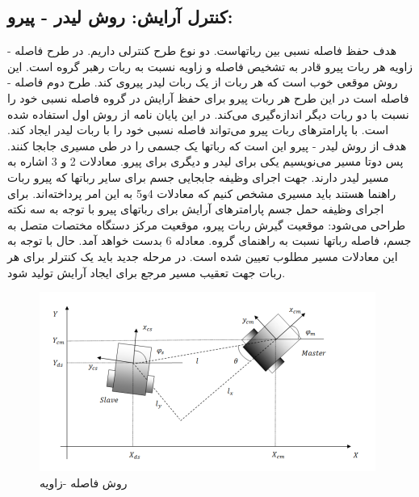 \subsection{کنترل آرایش: روش لیدر - پیرو:}
هدف حفظ فاصله نسبی بین رباتهاست. دو نوع طرح کنترلی داریم. در طرح فاصله - زاویه هر ربات پیرو قادر به تشخیص فاصله و زاویه نسبت به ربات رهبر گروه است. این روش موقعی خوب است که هر ربات از یک ربات لیدر پیروی کند.
طرح دوم فاصله - فاصله است در این طرح هر ربات پیرو برای حفظ آرایش در گروه فاصله نسبی خود را نسبت با دو ربات دیگر اندازه‌گیری می‌کند.
در این پایان نامه از روش اول استفاده شده است.
با پارامترهای 
ربات پیرو می‌تواند فاصله نسبی خود را با ربات لیدر ایجاد کند.
هدف از روش لیدر - پیرو این است که رباتها یک جسمی را در طی مسیری جابجا کنند. پس دوتا مسیر می‌نویسیم یکی برای لیدر و دیگری برای پیرو. معادلات 2 و 3 اشاره به مسیر لیدر دارند. جهت اجرای وظیفه جابجایی جسم برای سایر رباتها که پیرو ربات راهنما هستند باید مسیری مشخص کنیم که معادلات 4و5 به این امر پرداخته‌اند.
برای اجرای وظیفه حمل جسم پارامترهای آرایش برای رباتهای پیرو با توجه به سه نکته طراحی می‌شود: موقعیت گیرش ربات پیرو، موقعیت مرکز دستگاه مختصات متصل به جسم، فاصله رباتها نسبت به راهنمای گروه. معادله 6 بدست خواهد آمد.
حال با توجه به این معادلات مسیر مطلوب تعیین شده است.
در مرحله جدید باید یک کنترلر برای هر ربات جهت تعقیب مسیر مرجع برای ایجاد آرایش تولید شود.

\begin{figure}[h]
	\centering
	\includegraphics[width=0.7\linewidth]{images/4}
	\caption{روش فاصله -زاویه}
	\label{fig:4}
\end{figure}
\noindent\unskip

